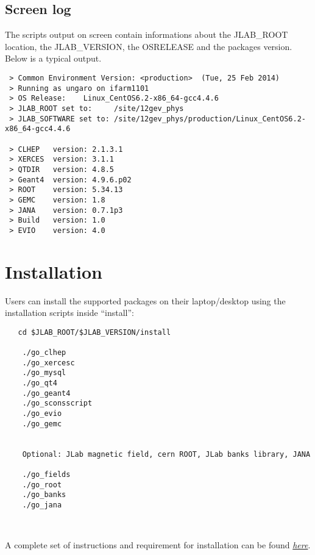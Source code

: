 \subsection{Screen log}
The scripts output on screen contain informations about the JLAB\_ROOT location,
the JLAB\_VERSION, the OSRELEASE and the packages version. Below is a typical output.

\begin{verbatim}
 > Common Environment Version: <production>  (Tue, 25 Feb 2014)
 > Running as ungaro on ifarm1101
 > OS Release:    Linux_CentOS6.2-x86_64-gcc4.4.6
 > JLAB_ROOT set to:     /site/12gev_phys
 > JLAB_SOFTWARE set to: /site/12gev_phys/production/Linux_CentOS6.2-x86_64-gcc4.4.6

 > CLHEP   version: 2.1.3.1
 > XERCES  version: 3.1.1
 > QTDIR   version: 4.8.5
 > Geant4  version: 4.9.6.p02
 > ROOT    version: 5.34.13
 > GEMC    version: 1.8
 > JANA    version: 0.7.1p3
 > Build   version: 1.0
 > EVIO    version: 4.0

\end{verbatim}
       
\clearpage\newpage
          
\section{Installation}
Users can install the supported packages on their laptop/desktop using the installation scripts inside ``install'':
\begin{verbatim}
   cd $JLAB_ROOT/$JLAB_VERSION/install

    ./go_clhep
    ./go_xercesc
    ./go_mysql
    ./go_qt4
    ./go_geant4
    ./go_sconsscript
    ./go_evio
    ./go_gemc
	
    
	Optional: JLab magnetic field, cern ROOT, JLab banks library, JANA
	
    ./go_fields
    ./go_root
    ./go_banks
    ./go_jana
    
    
\end{verbatim}
A complete set of instructions and requirement for installation can be found
\href{https://gemc.jlab.org/gemc/Support/Entries/2011/8/1_Step_by_Step.html}{\it here}.











